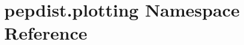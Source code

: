\hypertarget{namespacepepdist_1_1plotting}{}\section{pepdist.\+plotting Namespace Reference}
\label{namespacepepdist_1_1plotting}
